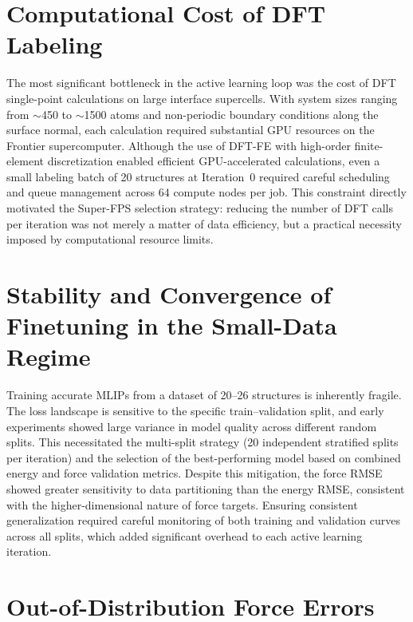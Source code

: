 \documentclass[12pt,a4paper,oneside]{book}
\begin{document}
\section{Computational Cost of DFT Labeling}

The most significant bottleneck in the active learning loop was the cost of DFT
single-point calculations on large interface supercells. With system sizes ranging
from $\sim$450 to $\sim$1500 atoms and non-periodic boundary conditions along the
surface normal, each calculation required substantial GPU resources on the Frontier
supercomputer. Although the use of DFT-FE with high-order finite-element
discretization enabled efficient GPU-accelerated calculations, even a small labeling
batch of 20 structures at Iteration~0 required careful scheduling and queue management
across 64 compute nodes per job. This constraint directly motivated the Super-FPS
selection strategy: reducing the number of DFT calls per iteration was not merely a
matter of data efficiency, but a practical necessity imposed by computational resource
limits.

\section{Stability and Convergence of Finetuning in the Small-Data Regime}

Training accurate MLIPs from a dataset of 20--26 structures is inherently fragile.
The loss landscape is sensitive to the specific train--validation split, and early
experiments showed large variance in model quality across different random splits.
This necessitated the multi-split strategy (20 independent stratified splits per
iteration) and the selection of the best-performing model based on combined energy
and force validation metrics. Despite this mitigation, the force RMSE showed
greater sensitivity to data partitioning than the energy RMSE, consistent with
the higher-dimensional nature of force targets. Ensuring consistent generalization
required careful monitoring of both training and validation curves across all splits,
which added significant overhead to each active learning iteration.

\section{Out-of-Distribution Force Errors}
\end{document}
